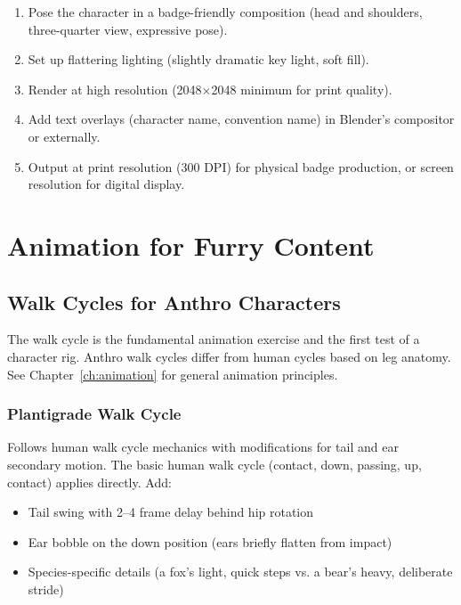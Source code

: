 \begin{enumerate}[leftmargin=2em]
  \item Pose the character in a badge-friendly composition (head and shoulders, three-quarter view, expressive pose).
  \item Set up flattering lighting (slightly dramatic key light, soft fill).
  \item Render at high resolution (2048$\times$2048 minimum for print quality).
  \item Add text overlays (character name, convention name) in Blender's compositor or externally.
  \item Output at print resolution (300 DPI) for physical badge production, or screen resolution for digital display.
\end{enumerate}



\section{Animation for Furry Content}
\label{sec:furry-animation}

\subsection{Walk Cycles for Anthro Characters}

The walk cycle is the fundamental animation exercise and the first test of a character rig. Anthro walk cycles differ from human cycles based on leg anatomy. See Chapter~\ref{ch:animation} for general animation principles.

\subsubsection{Plantigrade Walk Cycle}

Follows human walk cycle mechanics with modifications for tail and ear secondary motion. The basic human walk cycle (contact, down, passing, up, contact) applies directly. Add:

\begin{itemize}[leftmargin=2em]
  \item Tail swing with 2--4 frame delay behind hip rotation
  \item Ear bobble on the down position (ears briefly flatten from impact)
  \item Species-specific details (a fox's light, quick steps vs. a bear's heavy, deliberate stride)
\end{itemize}

